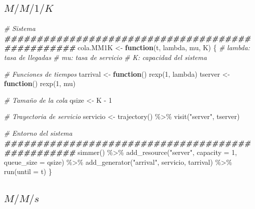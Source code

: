 \documentclass[
]{book}
\newenvironment{Shaded}{\begin{snugshade}}{\end{snugshade}}
\newcommand{\AttributeTok}[1]{\textcolor[rgb]{0.77,0.63,0.00}{#1}}
\newcommand{\CommentTok}[1]{\textcolor[rgb]{0.56,0.35,0.01}{\textit{#1}}}
\newcommand{\ControlFlowTok}[1]{\textcolor[rgb]{0.13,0.29,0.53}{\textbf{#1}}}
\newcommand{\DecValTok}[1]{\textcolor[rgb]{0.00,0.00,0.81}{#1}}
\newcommand{\DocumentationTok}[1]{\textcolor[rgb]{0.56,0.35,0.01}{\textbf{\textit{#1}}}}
\newcommand{\FunctionTok}[1]{\textcolor[rgb]{0.00,0.00,0.00}{#1}}
\newcommand{\NormalTok}[1]{#1}
\newcommand{\OtherTok}[1]{\textcolor[rgb]{0.56,0.35,0.01}{#1}}
\newcommand{\SpecialCharTok}[1]{\textcolor[rgb]{0.00,0.00,0.00}{#1}}
\newcommand{\StringTok}[1]{\textcolor[rgb]{0.31,0.60,0.02}{#1}}
\theoremstyle{definition}
\theoremstyle{definition}
\theoremstyle{definition}
\theoremstyle{definition}
\theoremstyle{remark}
\begin{document}
\hypertarget{mm1k-1}{%
\subsection{\texorpdfstring{\(M/M/1/K\)}{M/M/1/K}}\label{mm1k-1}}

\begin{Shaded}
\begin{Highlighting}[]
\CommentTok{\# Sistema}
\DocumentationTok{\#\#\#\#\#\#\#\#\#\#\#\#\#\#\#\#\#\#\#\#\#\#\#\#\#\#\#\#\#\#\#\#\#\#\#\#\#\#\#\#\#\#\#\#\#\#\#\#\#}
\NormalTok{cola.MM1K }\OtherTok{\textless{}{-}} \ControlFlowTok{function}\NormalTok{(t, lambda, mu, K)}
\NormalTok{\{}
  \CommentTok{\# lambda: tasa de llegadas}
  \CommentTok{\# mu: tasa de servicio}
  \CommentTok{\# K: capacidad del sistema}

  \CommentTok{\# Funciones de tiempos}
\NormalTok{  tarrival }\OtherTok{\textless{}{-}} \ControlFlowTok{function}\NormalTok{() }\FunctionTok{rexp}\NormalTok{(}\DecValTok{1}\NormalTok{, lambda)}
\NormalTok{  tserver }\OtherTok{\textless{}{-}} \ControlFlowTok{function}\NormalTok{() }\FunctionTok{rexp}\NormalTok{(}\DecValTok{1}\NormalTok{, mu)}
  
  \CommentTok{\# Tamaño de la cola}
\NormalTok{  qsize }\OtherTok{\textless{}{-}}\NormalTok{ K }\SpecialCharTok{{-}} \DecValTok{1}
  
  \CommentTok{\# Trayectoria de servicio}
\NormalTok{  servicio }\OtherTok{\textless{}{-}} \FunctionTok{trajectory}\NormalTok{() }\SpecialCharTok{\%\textgreater{}\%}
    \FunctionTok{visit}\NormalTok{(}\StringTok{"server"}\NormalTok{, tserver)               }

  \CommentTok{\# Entorno del sistema }
  \DocumentationTok{\#\#\#\#\#\#\#\#\#\#\#\#\#\#\#\#\#\#\#\#\#\#\#\#\#\#\#\#\#\#\#\#\#\#\#\#\#\#\#\#\#\#\#\#\#\#\#\#\#}
  \FunctionTok{simmer}\NormalTok{() }\SpecialCharTok{\%\textgreater{}\%}
    \FunctionTok{add\_resource}\NormalTok{(}\StringTok{"server"}\NormalTok{, }\AttributeTok{capacity =} \DecValTok{1}\NormalTok{, }\AttributeTok{queue\_size =}\NormalTok{ qsize) }\SpecialCharTok{\%\textgreater{}\%}           
    \FunctionTok{add\_generator}\NormalTok{(}\StringTok{"arrival"}\NormalTok{, servicio, tarrival) }\SpecialCharTok{\%\textgreater{}\%} 
    \FunctionTok{run}\NormalTok{(}\AttributeTok{until =}\NormalTok{ t)     }
\NormalTok{\}}
\end{Highlighting}
\end{Shaded}

\hypertarget{mms-1}{%
\subsection{\texorpdfstring{\(M/M/s\)}{M/M/s}}\label{mms-1}}
\end{document}
